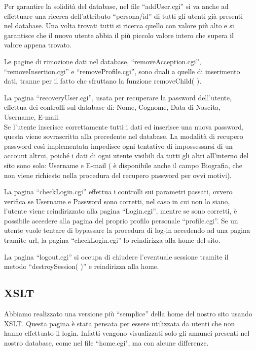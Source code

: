 \documentclass[12pt]{article}
\begin{document}
Per garantire la solidità del database, nel file “addUser.cgi” si va anche ad effettuare una ricerca dell'attributo “persona/id” di tutti gli utenti già presenti nel database. Una volta trovati tutti si ricerca quello con valore più alto e si garantisce che il nuovo utente abbia il più piccolo valore intero che supera il valore appena trovato.

Le pagine di rimozione dati nel database, “removeAcception.cgi”, “removeInsertion.cgi” e “removeProfile.cgi”, sono duali a quelle di inserimento dati, tranne per il fatto che sfruttano la funzione removeChild( ).

La pagina “recoveryUser.cgi”, usata per recuperare la password dell’utente, effettua dei controlli sul database di:
Nome, Cognome, Data di Nascita, Username, E-mail.\\
Se l’utente inserisce correttamente tutti i dati ed inserisce una nuova password, questa viene sovrascritta alla precedente nel database. La modalità di recupero password così implementata impedisce ogni tentativo di impossessarsi di un account altrui, poiché i dati di ogni utente visibili da tutti gli altri all’interno del sito sono solo: Username e E-mail ( è disponibile anche il campo Biografia, che non viene richiesto nella procedura del recupero password per ovvi motivi).

La pagina “checkLogin.cgi” effettua i controlli sui parametri passati, ovvero verifica se Username e Password sono corretti, nel caso in cui non lo siano, l’utente viene reindirizzato alla pagina “Login.cgi”, mentre se sono corretti, è possibile accedere alla pagina del proprio profilo personale “profile.cgi”. Se un utente vuole tentare di bypassare la procedura di log-in accedendo ad una pagina tramite url, la pagina “checkLogin.cgi” lo reindirizza alla home del sito.

La pagina “logout.cgi” si occupa di chiudere l’eventuale sessione tramite il metodo “destroySession( )” e reindirizza alla home.
	
	\subsection{XSLT}
	
	Abbiamo realizzato una versione più “semplice” della home del nostro sito usando XSLT. Questa pagina è stata pensata per essere utilizzata da utenti che non hanno effettuato il login. Infatti vengono visualizzati solo gli annunci presenti nel nostro database, come nel file “home.cgi", ma con alcune differenze.
\end{document}
